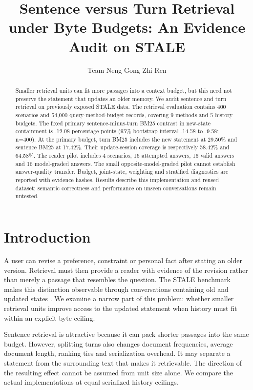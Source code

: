\documentclass{article}
\title{Sentence versus Turn Retrieval under Byte Budgets: An Evidence Audit on STALE}
\author{Team Neng Gong Zhi Ren}
\begin{document}
\maketitle
{}
\begin{abstract}
Smaller retrieval units can fit more passages into a context budget, but this need not preserve the statement that updates an older memory. We audit sentence and turn retrieval on previously exposed STALE data. The retrieval evaluation contains 400 scenarios and 54,000 query-method-budget records, covering 9 methods and 5 history budgets. The fixed primary sentence-minus-turn BM25 contrast in new-state containment is -12.08 percentage points (95\% bootstrap interval -14.58 to -9.58; n=400). At the primary budget, turn BM25 includes the new statement at 29.50\% and sentence BM25 at 17.42\%. Their update-session coverage is respectively 58.42\% and 64.58\%. The reader pilot includes 4 scenarios, 16 attempted answers, 16 valid answers and 16 model-graded answers. The small opposite-model-graded pilot cannot establish answer-quality transfer. Budget, joint-state, weighting and stratified diagnostics are reported with evidence hashes. Results describe this implementation and reused dataset; semantic correctness and performance on unseen conversations remain untested.
\end{abstract}
\section{Introduction}
A user can revise a preference, constraint or personal fact after stating an older version. Retrieval must then provide a reader with evidence of the revision rather than merely a passage that resembles the question. The STALE benchmark makes this distinction observable through conversations containing old and updated states \citep{stale}. We examine a narrow part of this problem: whether smaller retrieval units improve access to the updated statement when history must fit within an explicit byte ceiling.

Sentence retrieval is attractive because it can pack shorter passages into the same budget. However, splitting turns also changes document frequencies, average document length, ranking ties and serialization overhead. It may separate a statement from the surrounding text that makes it retrievable. The direction of the resulting effect cannot be assumed from unit size alone. We compare the actual implementations at equal serialized history ceilings.
\end{document}
